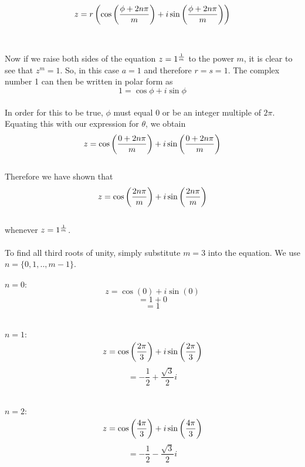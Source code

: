 \documentclass[12pt]{amsart}
\begin{document}
\begin{enumerate}
		$$z=r\left(\cos \bigg({\phi+2n\pi\over m}\bigg)+i\sin \bigg({\phi+2n\pi\over m}\bigg)\right)$$\\
		\\
		Now if we raise both sides of the equation $z=1^{1 \over m}$ to the power $m$, it is clear to see
		that $z^m=1$.  So, in this case $a=1$ and therefore $r=s=1$.  The complex number 1 can then be 			written in polar form as\\
		$$1 = \cos \phi+i\sin \phi$$\\
		In order for this to be true, $\phi$ must equal 0 or be an integer multiple of $2\pi$.  Equating this
		with our expression for $\theta$, we obtain\\
		
		$$z = \cos \bigg({0+2n\pi\over m}\bigg)+i\sin \bigg({0+2n\pi\over m}\bigg)$$\\
		
		Therefore we have shown that\\
		
		$$z = \cos \bigg({2n\pi\over m}\bigg)+i\sin \bigg({2n\pi\over m}\bigg)$$\\
		
		whenever $z=1^{1 \over m}$.\\
		\\
		To find all third roots of unity, simply substitute $m=3$ into the equation. We use $n=\{0,1,..,m-1\}$.\\
		\\
		$n=0:$
		$$z=\cos (0)+i\sin(0)$$
		\begin{equation*}
			=1+0
		\end{equation*}
		\begin{equation*}
			=1
		\end{equation*}\\
		\\
		$n=1:$	
		$$z=\cos \bigg({2\pi\over3}\bigg)+i\sin \bigg({2\pi\over3}\bigg)$$
		\begin{equation*}
			=-\frac{1}{2}+\frac{\sqrt{3}}{2}i
		\end{equation*}\\
		\\
		$n=2:$
		$$z=\cos \bigg({4\pi\over3}\bigg)+i\sin \bigg({4\pi\over3}\bigg)$$
		\begin{equation*}
			=-\frac{1}{2}-\frac{\sqrt{3}}{2}i
		\end{equation*}
		\smallskip

\end{enumerate}	
	
\end{document}
